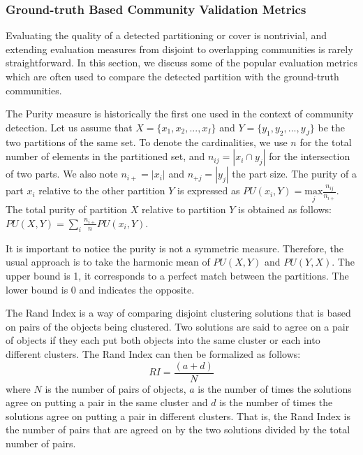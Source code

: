 \subsubsection*{Ground-truth Based Community Validation Metrics}\label{sec:ground-truth_metric}
Evaluating the quality of a detected partitioning or cover is nontrivial, and extending evaluation measures from disjoint to overlapping
communities is rarely straightforward. In this section, we discuss some of the popular evaluation metrics which
are often used to compare the detected partition with the ground-truth communities.




 The Purity measure \cite{nmi} is historically the first one used in the context of community
detection. Let us assume that $X=\{x_1,x_2,...,x_I\}$ and $Y=\{y_1,y_2,...,y_J\}$ be the two partitions of the same set. To denote the
cardinalities, we use $n$ for the total number of elements in the partitioned set, and $n_{ij}=|x_i \cap y_j|$  for the intersection of two
parts. We also note $n_{i+}=|x_i|$ and $n_{+j}=|y_j|$ the part size. The purity of a part $x_i$ relative to the other partition $Y$ is
expressed as $PU(x_i,Y)=\underset{j} {\mathrm{max}} \frac{n_{ij}}{n_{i+}}$. The total purity of partition $X$ relative to partition $Y$ is
obtained as follows: $ PU(X,Y)=\sum_i \frac{n_{i+}}{n} PU(x_i,Y)$.

It is important to notice the purity is not a symmetric measure. Therefore, the usual approach is to take the harmonic mean of
$PU(X,Y)$ and $PU(Y,X)$.
The upper bound is 1, it corresponds to a perfect match between the partitions. The lower bound is 0 and indicates the opposite. 


 The Rand Index \cite{rand1971} is a way of comparing disjoint clustering solutions that is based on
pairs of the objects being clustered. Two solutions are said to agree on a pair of objects if they each put both objects into the same
cluster or each into different clusters. The Rand Index can then be formalized as follows:
\begin{equation}
 RI=\frac{(a+d)}{N}
\end{equation}
where $N$ is the number of pairs of objects, $a$ is the number of times the solutions agree on putting a pair in the same cluster and $d$ is
the number of times the solutions agree on putting a pair in different clusters. That is, the Rand Index is the number of pairs that are
agreed on by the two solutions divided by the total number of pairs.

